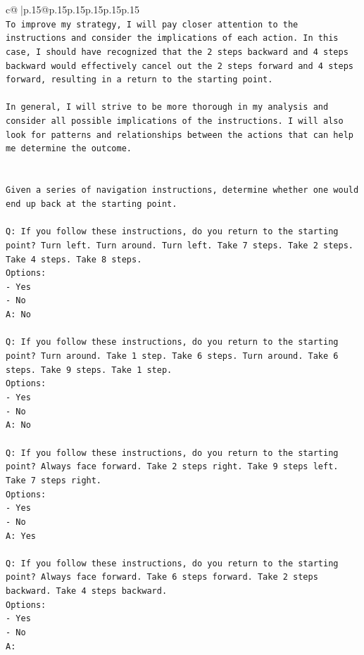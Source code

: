 \documentclass{article}
\begin{document}
{\begin{supertabular}{c@{$\;$}|p{.15\linewidth}@{}p{.15\linewidth}p{.15\linewidth}p{.15\linewidth}p{.15\linewidth}p{.15\linewidth}}
{{{\\ 
\texttt{To improve my strategy, I will pay closer attention to the instructions and consider the implications of each action. In this case, I should have recognized that the 2 steps backward and 4 steps backward would effectively cancel out the 2 steps forward and 4 steps forward, resulting in a return to the starting point. } \\
\\ 
\texttt{In general, I will strive to be more thorough in my analysis and consider all possible implications of the instructions. I will also look for patterns and relationships between the actions that can help me determine the outcome.} \\
\\ 
\\ 
\texttt{Given a series of navigation instructions, determine whether one would end up back at the starting point.} \\
\\ 
\texttt{Q: If you follow these instructions, do you return to the starting point? Turn left. Turn around. Turn left. Take 7 steps. Take 2 steps. Take 4 steps. Take 8 steps.} \\
\texttt{Options:} \\
\texttt{{-} Yes} \\
\texttt{{-} No} \\
\texttt{A: No} \\
\\ 
\texttt{Q: If you follow these instructions, do you return to the starting point? Turn around. Take 1 step. Take 6 steps. Turn around. Take 6 steps. Take 9 steps. Take 1 step.} \\
\texttt{Options:} \\
\texttt{{-} Yes} \\
\texttt{{-} No} \\
\texttt{A: No} \\
\\ 
\texttt{Q: If you follow these instructions, do you return to the starting point? Always face forward. Take 2 steps right. Take 9 steps left. Take 7 steps right.} \\
\texttt{Options:} \\
\texttt{{-} Yes} \\
\texttt{{-} No} \\
\texttt{A: Yes} \\
\\ 
\texttt{Q: If you follow these instructions, do you return to the starting point? Always face forward. Take 6 steps forward. Take 2 steps backward. Take 4 steps backward.} \\
\texttt{Options:} \\
\texttt{{-} Yes} \\
\texttt{{-} No} \\
\texttt{A:} \\
            }
        }
    }
     \\ \\


\end{supertabular}}
\end{document}
